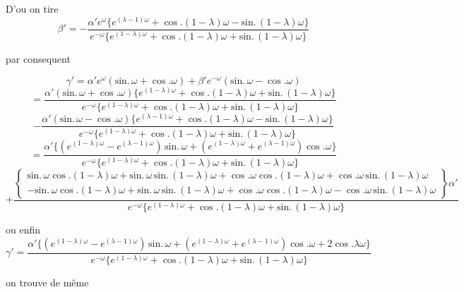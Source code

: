 \documentclass[11pt,a4paper]{article}
\begin{document}
D'ou on tire
\[ \beta'=-\frac{\alpha' e^{\omega}\{e^{(\lambda-1)\omega}+\cos.(1-\lambda)\omega-\text{sin.}\,(1-\lambda)\omega\}}{e^{-\omega}\{e^{(1-\lambda)\omega}+\cos.(1-\lambda)\omega+\text{sin.}\,(1-\lambda)\omega\}} \]

par consequent

\[ \gamma'=\alpha' e^{\omega}(\text{sin.}\,\omega+\cos.\omega)+\beta' e^{-\omega}(\text{sin.}\,\omega-\cos.\omega) \]
\[ =\frac{\alpha'(\text{sin.}\,\omega+\cos.\omega)\{e^{(1-\lambda)\omega}+\cos.(1-\lambda)\omega+\text{sin.}\,(1-\lambda)\omega\}}{e^{-\omega}\{e^{(1-\lambda)\omega}+\cos.(1-\lambda)\omega+\text{sin.}\,(1-\lambda)\omega\}} \]
\[ -\frac{\alpha'(\text{sin.}\,\omega-\cos.\omega)\{e^{(\lambda-1)\omega}+\cos.(1-\lambda)\omega-\text{sin.}\,(1-\lambda)\omega\}}{e^{-\omega}\{e^{(1-\lambda)\omega}+\cos.(1-\lambda)\omega+\text{sin.}\,(1-\lambda)\omega\}} \]
\[ =\frac{\alpha'\{(e^{(1-\lambda)\omega}-e^{(\lambda-1)\omega})\,\text{sin.}\,\omega+(e^{(1-\lambda)\omega}+e^{(\lambda-1)\omega})\cos.\omega\}}{e^{-\omega}\{e^{(1-\lambda)\omega}+\cos.(1-\lambda)\omega+\text{sin.}\,(1-\lambda)\omega\}} \]
\[ +\frac{\left\{\begin{array}{l} \text{sin.}\,\omega\cos.(1-\lambda)\omega+\text{sin.}\,\omega\,\text{sin.}\,(1-\lambda)\omega+\cos.\omega\cos.(1-\lambda)\omega+\cos.\omega\,\text{sin.}\,(1-\lambda)\omega \\ -\text{sin.}\,\omega\cos.(1-\lambda)\omega+\text{sin.}\,\omega\,\text{sin.}\,(1-\lambda)\omega+\cos.\omega\cos.(1-\lambda)\omega-\cos.\omega\,\text{sin.}\,(1-\lambda)\omega \end{array}\right\}\alpha'}{e^{-\omega}\{e^{(1-\lambda)\omega}+\cos.(1-\lambda)\omega+\text{sin.}\,(1-\lambda)\omega\}} \]

ou enfin
\[ \gamma'=\frac{\alpha'\{(e^{(1-\lambda)\omega}-e^{(\lambda-1)\omega})\,\text{sin.}\,\omega+(e^{(1-\lambda)\omega}+e^{(\lambda-1)\omega})\cos.\omega+2\cos.\lambda\omega\}}{e^{-\omega}\{e^{(1-\lambda)\omega}+\cos.(1-\lambda)\omega+\text{sin.}\,(1-\lambda)\omega\}} \]

on trouve de même
\end{document}
